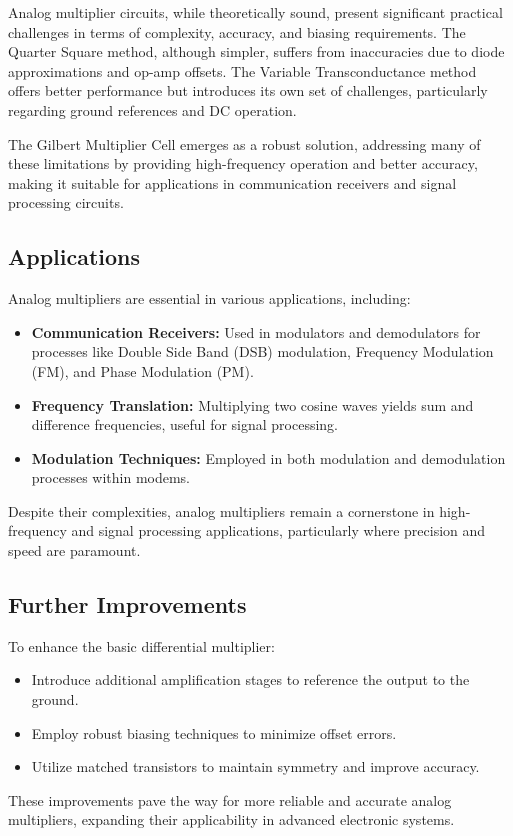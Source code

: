 Analog multiplier circuits, while theoretically sound, present significant practical challenges in terms of complexity, accuracy, and biasing requirements. The Quarter Square method, although simpler, suffers from inaccuracies due to diode approximations and op-amp offsets. The Variable Transconductance method offers better performance but introduces its own set of challenges, particularly regarding ground references and DC operation.

The Gilbert Multiplier Cell emerges as a robust solution, addressing many of these limitations by providing high-frequency operation and better accuracy, making it suitable for applications in communication receivers and signal processing circuits.

\subsection{Applications}

Analog multipliers are essential in various applications, including:

\begin{itemize}
    \item \textbf{Communication Receivers:} Used in modulators and demodulators for processes like Double Side Band (DSB) modulation, Frequency Modulation (FM), and Phase Modulation (PM).
    \item \textbf{Frequency Translation:} Multiplying two cosine waves yields sum and difference frequencies, useful for signal processing.
    \item \textbf{Modulation Techniques:} Employed in both modulation and demodulation processes within modems.
\end{itemize}

Despite their complexities, analog multipliers remain a cornerstone in high-frequency and signal processing applications, particularly where precision and speed are paramount.

\subsection{Further Improvements}

To enhance the basic differential multiplier:

\begin{itemize}
    \item Introduce additional amplification stages to reference the output to the ground.
    \item Employ robust biasing techniques to minimize offset errors.
    \item Utilize matched transistors to maintain symmetry and improve accuracy.
\end{itemize}

These improvements pave the way for more reliable and accurate analog multipliers, expanding their applicability in advanced electronic systems.

